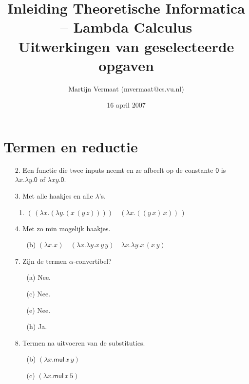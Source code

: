 \documentclass[a4paper,11pt]{article}
\title{Inleiding Theoretische Informatica -- Lambda Calculus\\
\normalsize{Uitwerkingen van geselecteerde opgaven}}
\author{Martijn Vermaat (mvermaat@cs.vu.nl)}
\date{16 april 2007}
\begin{document}
\maketitle


\section{Termen en reductie}


\begin{enumerate}


\item[2.]
Een functie die twee inputs neemt en ze afbeelt op de constante $\textsf{0}$ is
$\lambda x. \lambda y. \textsf{0}$ of $\lambda xy. \textsf{0}$.


\item[3.]
Met alle haakjes en alle $\lambda$'s.
\begin{enumerate}

\item
$( \, (\lambda x. (\lambda y. (x \, (y \, z)))) \quad (\lambda x. ((y \, x) \, x)) \, )$

\end{enumerate}


\item[4.]
Met zo min mogelijk haakjes.
\begin{enumerate}

\item[(b)]
$(\lambda x. x) \quad (\lambda x. \lambda y. x \, y \, y) \quad \lambda x. \lambda y. x \, (x \, y)$

\end{enumerate}


\item[7.]
Zijn de termen $\alpha$-convertibel?
\begin{enumerate}

\item[(a)] Nee.
\item[(c)] Nee.
\item[(e)] Nee.
\item[(h)] Ja.

\end{enumerate}


\item[8.]
Termen na uitvoeren van de substituties.
\begin{enumerate}

\item[(b)] $(\lambda x. \textsf{mul} \, x \, y)$

\item[(c)] $(\lambda x. \textsf{mul} \, x \, 5)$


\end{enumerate}
\end{enumerate}
\end{document}
